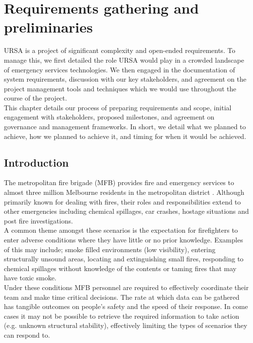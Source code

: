 \documentclass[capstone_report.tex]{subfiles}
\begin{document}
\chapter{Requirements gathering and preliminaries}
URSA is a project of significant complexity and open-ended requirements. To manage this, we first detailed the role URSA would play in a crowded landscape of emergency services technologies. We then engaged in the documentation of system requirements, discussion with our key stakeholders, and agreement on the project management tools and techniques which we would use throughout the course of the project.\\

This chapter details our process of preparing requirements and scope, initial engagement with stakeholders, proposed milestones, and agreement on governance and management frameworks. In short, we detail what we planned to achieve, how we planned to achieve it, and timing for when it would be achieved.

\pagebreak

\section{Introduction}
    The metropolitan fire brigade (MFB) provides fire and emergency services to almost three million Melbourne residents in the metropolitan district \cite{MFB_about}.  Although primarily known for dealing with fires, their roles and responsibilities extend to other emergencies including chemical spillages, car crashes, hostage situations and post fire investigations.\\

    A common theme amongst these scenarios is the expectation for firefighters to enter adverse conditions where they have little or no prior knowledge. Examples of this may include; smoke filled environments (low visibility), entering structurally unsound areas, locating and extinguishing small fires, responding to chemical spillages without knowledge of the contents or taming fires that may have toxic smoke.\\

    Under these conditions MFB personnel are required to effectively coordinate their team and make time critical decisions.  The rate at which data can be gathered has tangible outcomes on people's safety and the speed of their response.  In come cases it may not be possible to retrieve the required information to take action (e.g. unknown structural stability), effectively limiting the types of scenarios they can respond to.\\
\end{document}
